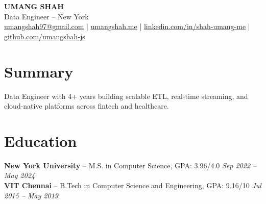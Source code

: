 \documentclass[10pt]{article}
\newcommand{\BodyTextSize}{\fontsize{10.7pt}{11.4pt}\selectfont}
\begin{document}
\begin{center}
{\LARGE \textbf{UMANG SHAH}}\\[-1pt]
Data Engineer -- New York\\[-1pt]
\BodyTextSize \href{mailto:umangshah97@gmail.com}{umangshah97@gmail.com} \;|\; \href{https://umangshah.me}{umangshah.me} \;|\; \href{https://www.linkedin.com/in/shah-umang-me}{linkedin.com/in/shah-umang-me} \;|\; \href{https://github.com/umangshah-js}{github.com/umangshah-js}
\end{center}

\vspace{-8pt}
\BodyTextSize

\section*{Summary}
Data Engineer with 4+ years building scalable ETL, real-time streaming, and cloud-native platforms across fintech and healthcare.

\vspace{0pt}

\section*{Education}
\textbf{New York University} -- M.S. in Computer Science, GPA: 3.96/4.0 \hfill \textit{Sep 2022 -- May 2024} \\
\textbf{VIT Chennai} -- B.Tech in Computer Science and Engineering, GPA: 9.16/10 \hfill \textit{Jul 2015 -- May 2019}

\vspace{0pt}
\end{document}
